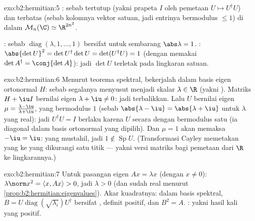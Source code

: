 \begin{solution}{exo:b2:hermitian:5}
: sebab tertutup (yakni prapeta $I$ oleh pemetaan  $U \mapsto
U^\dagger U$) dan terbatas (sebab kolomnya vektor satuan, jadi entrinya
bermodulus $\leq 1$) di dalam $\mathcal{M}_n(\C) \simeq \R^{2n^2}$.

: sebab $\operatorname{diag}(\lambda, 1, \dots, 1)$ bersifat 
untuk sembarang $\abs\lambda = 1$. : $\abs{\det U}^2 = \det
U^\dagger \det U = \det(U^\dagger U) = 1$ (dengan memakai $\det A^\dagger =
\conj{\det A}$): jadi $\det U$ terletak pada lingkaran satuan.
\end{solution}

\begin{solution}{exo:b2:hermitian:6}
Menurut teorema spektral, bekerjalah dalam basis eigen ortonormal $H$:
sebab segalanya menyusut menjadi skalar $\lambda \in \R$ (yakni ).
Matriks $H + \iu I$ bernilai eigen $\lambda + \iu \neq 0$: jadi terbalikkan. Lalu $U$
bernilai eigen $\mu = \frac{\lambda - \iu}{\lambda + \iu}$, yang
bermodulus $1$ (sebab $\abs{\lambda - \iu} = \abs{\lambda + \iu}$ untuk
$\lambda$ yang real): jadi $U^\dagger U = I$ berlaku karena $U$  secara  dengan  bermodulus satu (ia diagonal dalam
basis ortonormal yang dipilih). Dan $\mu = 1$ akan memaksa $-\iu = \iu$:
yang mustahil, jadi $1 \notin \operatorname{Sp} U$. (Transformasi Cayley
memetakan yang  ke yang  dikurangi satu titik --- yakni versi
matriks bagi pemetaan dari $\R$ ke lingkarannya.)
\end{solution}

\begin{solution}{exo:b2:hermitian:7}
Untuk pasangan eigen $Ax = \lambda x$ (dengan $x \neq 0$): $\lambda\norm x^2 =
\langle x, Ax\rangle > 0$, jadi $\lambda > 0$ (dan sudah real menurut
\cref{prop:b2:hermitian:eigenvalues}). Akar kuadratnya: dalam basis
spektral, $B = U\operatorname{diag}(\sqrt{\lambda_i})U^\dagger$ bersifat
, definit positif, dan $B^2 = A$. : yakni hasil kali
 yang positif.
\end{solution}

